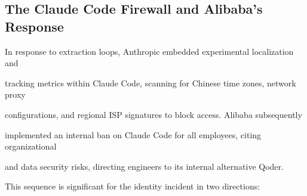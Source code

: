 \subsection{The Claude Code Firewall and Alibaba's Response}











In response to extraction loops, Anthropic embedded experimental localization and





tracking metrics within Claude Code, scanning for Chinese time zones, network proxy





configurations, and regional ISP signatures to block access. Alibaba subsequently





implemented an internal ban on Claude Code for all employees, citing organizational





and data security risks, directing engineers to its internal alternative Qoder.











This sequence is significant for the identity incident in two directions:











